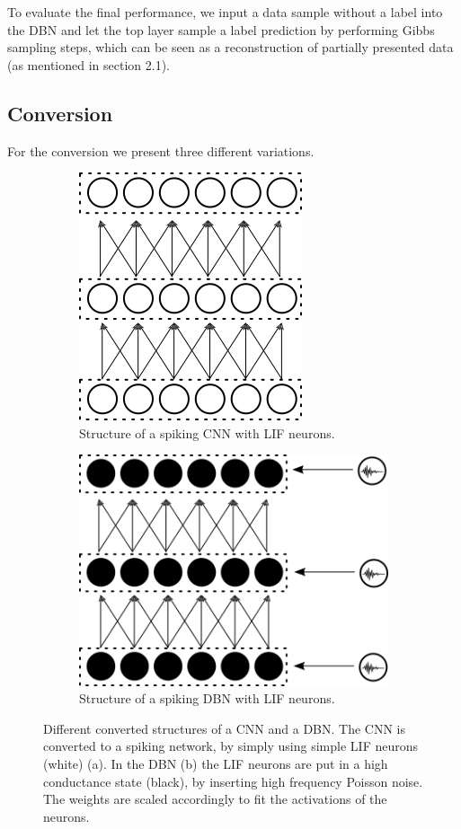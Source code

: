 To evaluate the final performance, we input a data sample without a label into the DBN and let the top layer sample a label prediction by performing Gibbs sampling steps, which can be seen as a reconstruction of partially presented data (as mentioned in section 2.1).


\subsection{Conversion}

For the conversion we present three different variations.

\begin{figure}
	\centering
	\begin{subfigure}[t]{.5\textwidth}
  		\centering
  		\includegraphics[width=.6\linewidth]{imgs/convert_cnn.png}
  		\caption{Structure of a spiking CNN with LIF neurons.}
  		\label{fig:sub1}
	\end{subfigure}%
	\begin{subfigure}[t]{.5\textwidth}
  		\centering
  		\includegraphics[width=.8\linewidth]{imgs/convert_dbn.png}
  		\caption{Structure of a spiking DBN with LIF neurons.}
  		\label{fig:sub2}
  	\end{subfigure}
	\caption{Different converted structures of a CNN and a DBN. The CNN is converted to a spiking network, by simply using simple LIF neurons (white) (a). In the DBN (b) the LIF neurons are put in a high conductance state (black), by inserting high frequency Poisson noise. The weights are scaled accordingly to fit the activations of the neurons.}
	\label{fig:converted}
\end{figure}


